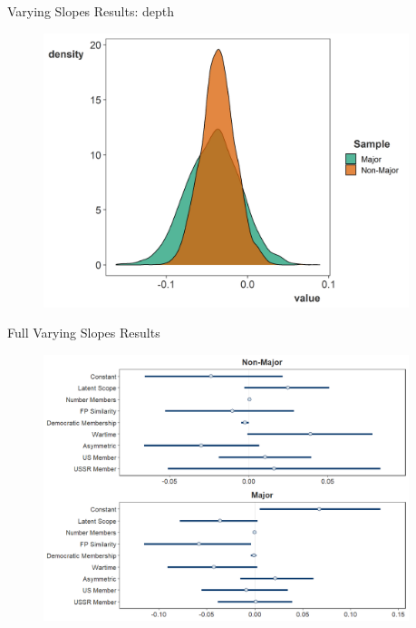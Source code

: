 \documentclass[12pt]{beamer}
\begin{document}

\begin{frame}{Varying Slopes Results: depth}

\begin{figure}[htbp]
	\centering
		\includegraphics[width=0.95\textwidth]{var-slopes-depth.png}
\end{figure}

\end{frame}


\begin{frame}{Full Varying Slopes Results}

\begin{figure}[htbp]
	\centering
		\includegraphics[width=0.95\textwidth]{vs-res-full.png}
\end{figure}

\end{frame}
\end{document}

